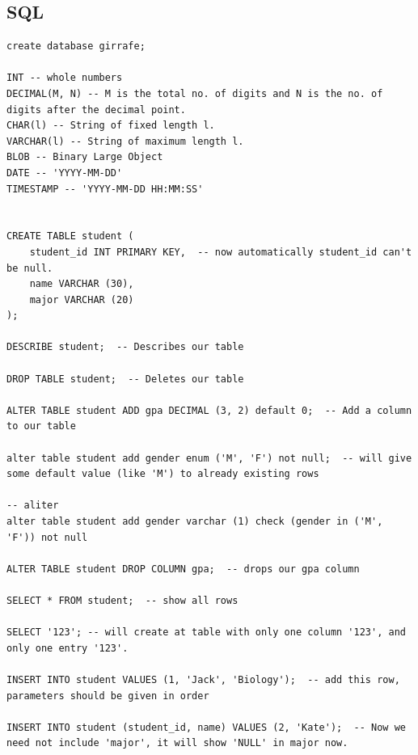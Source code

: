 \documentclass[8pt, a4paper, oneside, twocolumn]{extarticle}
\begin{document}
\subsection{SQL}
\begin{verbatim}
create database girrafe;

INT -- whole numbers
DECIMAL(M, N) -- M is the total no. of digits and N is the no. of digits after the decimal point.
CHAR(l) -- String of fixed length l.
VARCHAR(l) -- String of maximum length l.
BLOB -- Binary Large Object
DATE -- 'YYYY-MM-DD'
TIMESTAMP -- 'YYYY-MM-DD HH:MM:SS'


CREATE TABLE student (
    student_id INT PRIMARY KEY,  -- now automatically student_id can't be null.
    name VARCHAR (30),
    major VARCHAR (20)
);

DESCRIBE student;  -- Describes our table

DROP TABLE student;  -- Deletes our table

ALTER TABLE student ADD gpa DECIMAL (3, 2) default 0;  -- Add a column to our table

alter table student add gender enum ('M', 'F') not null;  -- will give some default value (like 'M') to already existing rows

-- aliter
alter table student add gender varchar (1) check (gender in ('M', 'F')) not null

ALTER TABLE student DROP COLUMN gpa;  -- drops our gpa column

SELECT * FROM student;  -- show all rows

SELECT '123'; -- will create at table with only one column '123', and only one entry '123'.

INSERT INTO student VALUES (1, 'Jack', 'Biology');  -- add this row, parameters should be given in order

INSERT INTO student (student_id, name) VALUES (2, 'Kate');  -- Now we need not include 'major', it will show 'NULL' in major now.
\end{verbatim}
\end{document}
